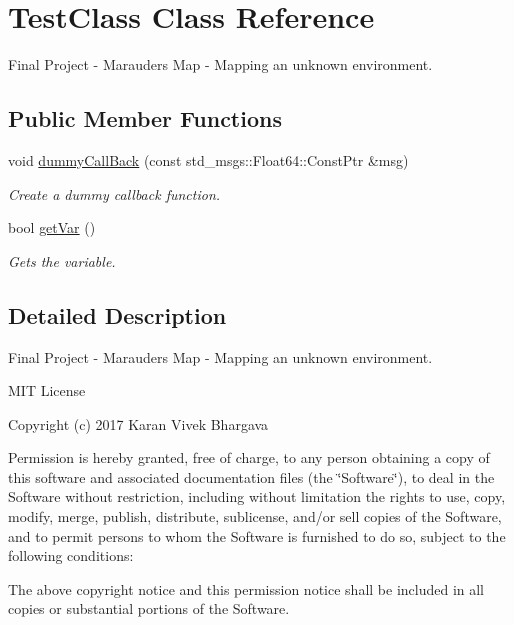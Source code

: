 \hypertarget{class_test_class}{}\section{Test\+Class Class Reference}
\label{class_test_class}


Final Project -\/ Marauders Map -\/ Mapping an unknown environment.  


\subsection*{Public Member Functions}
\begin{DoxyCompactItemize}
\item 
void \hyperlink{class_test_class_af518368062d7b5c807c8343679d06e82}{dummy\+Call\+Back} (const std\+\_\+msgs\+::\+Float64\+::\+Const\+Ptr \&msg)
\begin{DoxyCompactList}\small\item\em Create a dummy callback function. \end{DoxyCompactList}\item 
bool \hyperlink{class_test_class_a796453f00baf49aaad4c083ba518050d}{get\+Var} ()
\begin{DoxyCompactList}\small\item\em Gets the variable. \end{DoxyCompactList}\end{DoxyCompactItemize}


\subsection{Detailed Description}
Final Project -\/ Marauders Map -\/ Mapping an unknown environment. 

M\+IT License

Copyright (c) 2017 Karan Vivek Bhargava

Permission is hereby granted, free of charge, to any person obtaining a copy of this software and associated documentation files (the \char`\"{}\+Software\char`\"{}), to deal in the Software without restriction, including without limitation the rights to use, copy, modify, merge, publish, distribute, sublicense, and/or sell copies of the Software, and to permit persons to whom the Software is furnished to do so, subject to the following conditions\+:

The above copyright notice and this permission notice shall be included in all copies or substantial portions of the Software.


